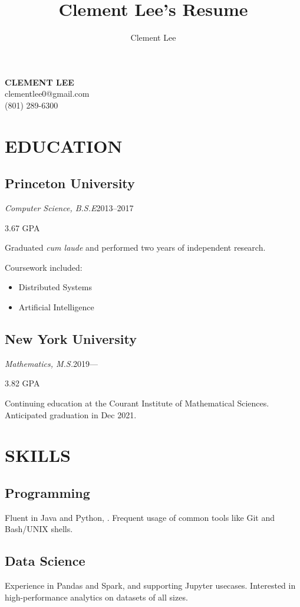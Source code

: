 \documentclass[11pt]{article}
\title{Clement Lee's Resume}
\author{Clement Lee}
\date{}
\begin{document}
{\Huge\textbf{CLEMENT LEE}}
\smallskip\\
clementlee0@gmail.com\\
(801) 289-6300\\

\begin{minipage}[t]{0.40\textwidth}
  \section*{\LARGE EDUCATION}
  \subsection*{Princeton University}
  \emph{Computer Science, B.S.E}\hfill 2013--2017
  
  \hfill 3.67 GPA
  \smallskip

  Graduated \emph{cum laude} and performed two years of independent research.

  Coursework included:
  \begin{itemize}
    \item Distributed Systems
    \item Artificial Intelligence
  \end{itemize}

  \medskip
  \subsection*{New York University}
  \emph{Mathematics, M.S.}\hfill2019---

  \hfill 3.82 GPA
  \smallskip
  
  Continuing education at the Courant Institute of Mathematical Sciences. 
  Anticipated graduation in Dec 2021.

  \bigskip
  \section*{\LARGE SKILLS}

  \subsection*{Programming}
  Fluent in Java and Python, .
  Frequent usage of common tools like Git and Bash/UNIX shells.

  \medskip
  \subsection*{Data Science}
  Experience in Pandas and Spark, and supporting Jupyter usecases.
  Interested in high-performance analytics on datasets of all sizes.


\end{minipage}
\end{document}
